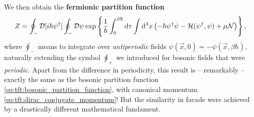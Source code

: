 We then obtain the \textbf{fermionic partition function}
\begin{equation}
	Z = \oint_- \mathcal{D} [i \hbar \psi^\dagger] \oint_- \mathcal{D} \psi \exp \left\{ \frac{1}{\hbar} \int_0^{\beta \hbar} \mathop{}\!\mathrm{d} \tau \int \mathop{}\!\mathrm{d}^3 x \left( -\hbar \psi^\dagger \dot{\psi} - \mathcal{H} ( \psi^\dagger, \psi ) + \mu \mathcal{N} \right) \right\} ,
\label{eq:tft:fermion_partition_function}
\end{equation}
where $\oint_-$ means to integrate over \emph{antiperiodic} fields $\psi(\vec{x}, 0) = -\psi(\vec{x}, \beta \hbar)$, naturally extending the symbol $\oint_+$ we introduced for bosonic fields that were \emph{periodic}.
Apart from the difference in periodicity, this result is -- remarkably -- exactly the same as the bosonic partition function \eqref{eq:tft:bosonic_partition_function}, with canonical momentum \eqref{eq:tft:dirac_conjugate_momentum}!
But the similarity in facade were achieved by a drastically different mathematical fundament.


\iffalse
The partition function is therefore
\begin{equation}
\begin{split}
	Z &= \int \dif \psi_0^\dagger \int \dif \psi_0 \, e^{-\psi_{n+1}^\dagger \psi_{n+1}} \braket{-\psi_0 | e^{-\beta(\hat{H} - \mu \hat{N})} | \psi_0} \\
	  &= \prod_n \int \dif \psi_n^\dagger \int \dif \psi_n \, e^{-\psi_{n+1}^\dagger \psi_{n+1}} \braket{\psi_{n+1} | e^{-(\hat{H} - \mu \hat{N}) \Delta \tau / \hbar} | \psi_n} \\
	  &= \prod_n \int \dif \psi_n^\dagger \int \dif \psi_n \, e^{-\psi_{n+1}^\dagger \psi_{n+1}} \braket{\psi_{n+1} | \psi_n} e^{-(H_n - \mu N) \Delta \tau / \hbar} \\
	  &= \prod_n \int \dif \psi_n^\dagger \int \dif \psi_n \, \exp \left\{ -\frac{\Delta t}{\hbar} \sum_n \int \dif^3 x \left( \psi^\dagger_{n+1} \frac{\psi_{n+1} - \psi_n}{\Delta t} + \ham - \mu \numdensity \right) \right\} \\
	  &= \oint_- \pathintdif \psi^\dagger \oint_- \pathintdif \psi \exp \left\{ \frac{1}{\hbar} \int_0^{\beta \hbar} \dif \tau \int \dif^3 x \left( -\psi^\dagger(\vec{x},\tau) \dot{\psi}(\vec{x},\tau) - \ham \left( \psi^\dagger(\vec{x},\tau), \psi(\vec{x},\tau) \right) + \mu \numdensity \right) \right\} \\
\end{split}
\end{equation}
\fi

